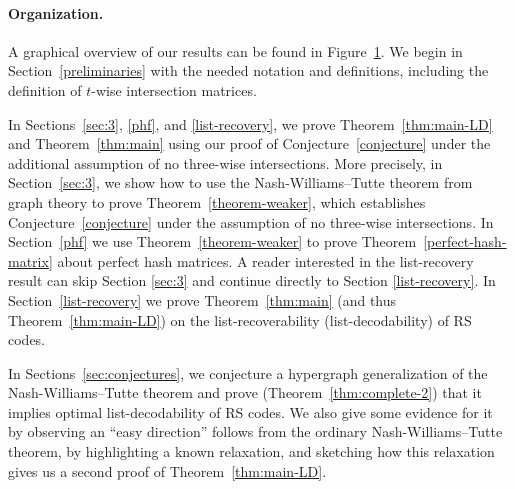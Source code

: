 \documentclass[11pt]{article}
\newcommand{\ryl}[1]{{\color{red} {\small [Ray: #1]}}}
\begin{document}
\paragraph{Organization.}
A graphical overview of our results can be found in Figure~\ref{fig:M1}.
We begin in Section~\ref{preliminaries} with the needed notation and definitions, including the definition of $t$-wise intersection matrices.

In Sections~\ref{sec:3}, \ref{phf}, and \ref{list-recovery}, we prove Theorem~\ref{thm:main-LD} and Theorem~\ref{thm:main} using our proof of Conjecture~\ref{conjecture} under the additional assumption of no three-wise intersections.  More precisely,
in Section~\ref{sec:3}, we show how to use the Nash-Williams--Tutte theorem from graph theory to prove Theorem~\ref{theorem-weaker}, which establishes Conjecture~\ref{conjecture} under the assumption of no three-wise intersections.
In Section~\ref{phf} we use Theorem~\ref{theorem-weaker} to prove Theorem~\ref{perfect-hash-matrix} about perfect hash matrices. A reader interested in the list-recovery result can skip Section \ref{sec:3} and continue directly to Section \ref{list-recovery}.
In Section~\ref{list-recovery} we prove Theorem~\ref{thm:main} (and thus Theorem~\ref{thm:main-LD}) on the list-recoverability (list-decodability) of RS codes.

In Sections~\ref{sec:conjectures}, we conjecture a hypergraph generalization of the Nash-Williams--Tutte theorem and prove (Theorem~\ref{thm:complete-2}) that it implies optimal list-decodability of RS codes.
We also give some evidence for it by observing an ``easy direction'' follows from the ordinary Nash-Williams--Tutte theorem, by highlighting a known relaxation, and sketching how this relaxation gives us a second proof of Theorem~\ref{thm:main-LD}.



%

\begin{figure}[omitted: a diagram of this paper's results, not reproduced here]\label{diagram}\label{fig:M1}\end{figure}
\end{document}
